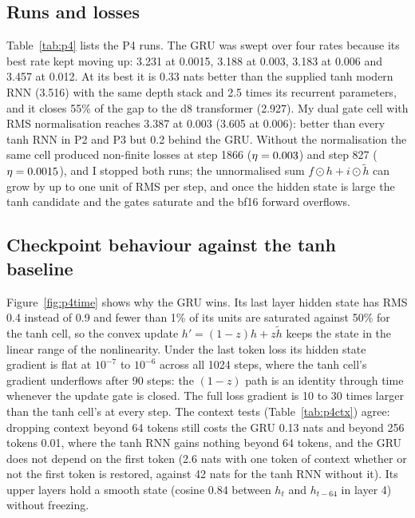 \subsection{Runs and losses}
Table~\ref{tab:p4} lists the P4 runs. The GRU was swept over four rates because its best rate kept moving up: 3.231 at 0.0015, 3.188 at 0.003, 3.183 at 0.006 and 3.457 at 0.012. At its best it is 0.33 nats better than the supplied tanh modern RNN (3.516) with the same depth stack and 2.5 times its recurrent parameters, and it closes 55\% of the gap to the d8 transformer (2.927). My dual gate cell with RMS normalisation reaches 3.387 at 0.003 (3.605 at 0.006): better than every tanh RNN in P2 and P3 but 0.2 behind the GRU. Without the normalisation the same cell produced non-finite losses at step 1866 ($\eta=0.003$) and step 827 ($\eta=0.0015$), and I stopped both runs; the unnormalised sum $f\odot h + i\odot\tilde h$ can grow by up to one unit of RMS per step, and once the hidden state is large the tanh candidate and the gates saturate and the bf16 forward overflows.
\ablationparagraph

\begin{table}[h]\centering\small
\caption{P4 runs. Losses are FP32 recomputations on the saved checkpoints.}
\label{tab:p4}

\end{table}

\subsection{Checkpoint behaviour against the tanh baseline}
Figure~\ref{fig:p4time} shows why the GRU wins. Its last layer hidden state has RMS 0.4 instead of 0.9 and fewer than 1\% of its units are saturated against 50\% for the tanh cell, so the convex update $h' = (1-z)h + z\tilde h$ keeps the state in the linear range of the nonlinearity. Under the last token loss its hidden state gradient is flat at $10^{-7}$ to $10^{-6}$ across all 1024 steps, where the tanh cell's gradient underflows after 90 steps: the $(1-z)$ path is an identity through time whenever the update gate is closed. The full loss gradient is 10 to 30 times larger than the tanh cell's at every step. The context tests (Table~\ref{tab:p4ctx}) agree: dropping context beyond 64 tokens still costs the GRU 0.13 nats and beyond 256 tokens 0.01, where the tanh RNN gains nothing beyond 64 tokens, and the GRU does not depend on the first token (2.6 nats with one token of context whether or not the first token is restored, against 42 nats for the tanh RNN without it). Its upper layers hold a smooth state (cosine 0.84 between $h_t$ and $h_{t-64}$ in layer 4) without freezing.

